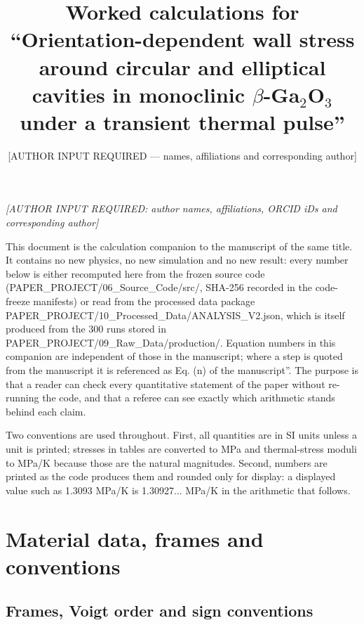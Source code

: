 \documentclass[preprint,12pt]{elsarticle}
\begin{document}
\begin{frontmatter}
\title{Worked calculations for ``Orientation-dependent wall stress around circular and elliptical cavities in monoclinic $\beta$-Ga$_2$O$_3$ under a transient thermal pulse''}
\author{[AUTHOR INPUT REQUIRED --- names, affiliations and corresponding author]}
\end{frontmatter}
\emph{[AUTHOR INPUT REQUIRED: author names, affiliations, ORCID iDs and corresponding author]}

This document is the calculation companion to the manuscript of the same title. It contains no new physics, no new simulation and no new result: every number below is either recomputed here from the frozen source code (PAPER\_PROJECT/06\_Source\_Code/src/, SHA-256 recorded in the code-freeze manifests) or read from the processed data package PAPER\_PROJECT/10\_Processed\_Data/ANALYSIS\_V2.json, which is itself produced from the 300 runs stored in PAPER\_PROJECT/09\_Raw\_Data/production/. Equation numbers in this companion are independent of those in the manuscript; where a step is quoted from the manuscript it is referenced as Eq. (n) of the manuscript''. The purpose is that a reader can check every quantitative statement of the paper without re-running the code, and that a referee can see exactly which arithmetic stands behind each claim.

Two conventions are used throughout. First, all quantities are in SI units unless a unit is printed; stresses in tables are converted to MPa and thermal-stress moduli to MPa/K because those are the natural magnitudes. Second, numbers are printed as the code produces them and rounded only for display: a displayed value such as 1.3093 MPa/K is 1.30927$\ldots$ MPa/K in the arithmetic that follows.

\section{Material data, frames and conventions}
\label{sec:1}

\subsection{Frames, Voigt order and sign conventions}
\label{sec:1.1}
\end{document}

